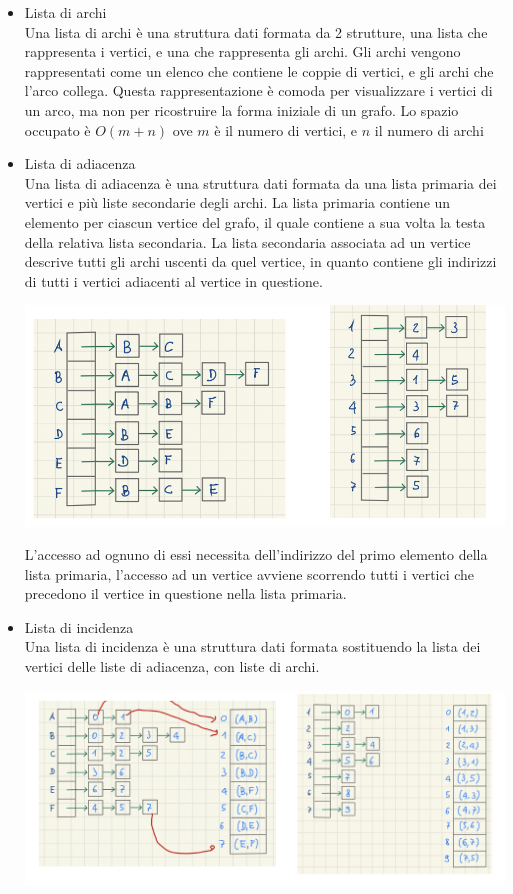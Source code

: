 \documentclass[11pt, oneside]{article}   	%
\begin{document}
\begin{itemize}
\item Lista di archi\\
Una lista di archi è una struttura dati formata da 2 strutture, una lista che rappresenta i vertici, e una che rappresenta gli archi. Gli archi vengono rappresentati come un elenco che contiene le coppie di vertici, e gli archi che l'arco collega.
Questa rappresentazione è comoda per visualizzare i vertici di un arco, ma non per ricostruire la forma iniziale di un grafo. Lo spazio occupato è $O(m+n)$ ove $m$ è il numero di vertici, e $n$ il numero di archi
\item Lista di adiacenza\\
Una lista di adiacenza è una struttura dati formata da una lista primaria dei vertici e più liste secondarie degli archi.
La lista primaria contiene un elemento per ciascun vertice del grafo, il quale contiene a sua volta la testa della relativa lista secondaria. La lista secondaria associata ad un vertice descrive tutti gli archi uscenti da quel vertice, in quanto contiene gli indirizzi di tutti i vertici adiacenti al vertice in questione.
\begin{center}
\includegraphics[scale=0.8]{b2}
\end{center}
L’accesso ad ognuno di essi necessita dell’indirizzo del primo elemento della lista primaria, l’accesso ad un vertice avviene scorrendo tutti i vertici che precedono il vertice in questione nella lista primaria.
\item Lista di incidenza\\
Una lista di incidenza è una struttura dati formata sostituendo la lista dei vertici delle liste di adiacenza, con liste di archi.
\begin{center}
\includegraphics[scale=0.8]{b3}

\end{center}
\end{itemize}
\end{document}
